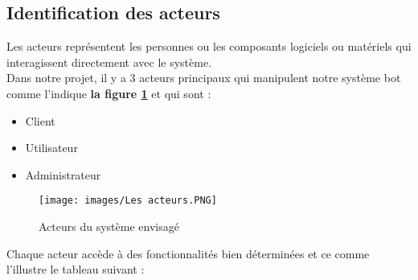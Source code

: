 \subsection{Identification des acteurs }
Les acteurs représentent les personnes ou les composants logiciels ou matériels qui interagissent directement avec le système.\\
Dans notre projet, il y a 3 acteurs principaux qui manipulent notre système bot comme l'indique \textbf{la figure \ref{fig:actors1}} et qui sont :
\begin{itemize}
	\item Client
	\item Utilisateur 
	\item Administrateur
\end{itemize}
\begin{figure}[H]
	\centering
	\texttt{[image: images/Les acteurs.PNG]}
	\caption{Acteurs du système envisagé}
	\label{fig:actors1}
\end{figure}
\indent Chaque acteur accède à des fonctionnalités bien déterminées et ce comme l'illustre le tableau suivant :
